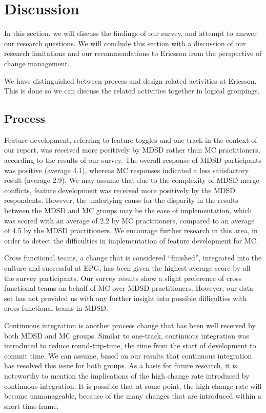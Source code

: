 \documentclass[final_report_innit.tex]{subfiles}
\begin{document}
\section{Discussion}

In this section, we will discuss the findings of our survey, and attempt to answer our research questions. We will conclude this section with a discussion of our research limitations and our recommendations to Ericsson from the perspective of change management. 

We have distinguished between process and design related activities at Ericsson. This is done so we can discuss the related activities together in logical groupings.

\subsection*{Process}

Feature development, referring to feature toggles and one track in the context of our report, was received more positively by MDSD rather than MC practitioners, according to the results of our survey. The overall response of MDSD participants was positive (average 4.1), whereas MC responses indicated a less satisfactory result (average 2.9). We may assume that due to the complexity of MDSD merge conflicts, feature development was received more positively by the MDSD respondents. However, the underlying cause for the disparity in the results between the MDSD and MC groups may be the ease of implementation, which was scored with an average of 2.2 by MC practitioners, compared to an average of 4.5 by the MDSD practitioners. We encourage further research in this area, in order to detect the difficulties in implementation of feature development for MC.

Cross functional teams, a change that is considered ``finished'', integrated into the culture and successful at EPG, has been given the highest average score by all the survey participants. Our survey results show a slight preference of cross functional teams on behalf of MC over MDSD practitioners. However, our data set has not provided us with any further insight into possible difficulties with cross functional teams in MDSD. 

Continuous integration is another process change that has been well received by both MDSD and MC groups. Similar to one-track, continuous integration was introduced to reduce round-trip-time, the time from the start of development to commit time. We can assume, based on our results that continuous integration has resolved this issue for both groups. As a basis for future research, it is noteworthy to mention the implications of the high change rate introduced by continuous integration. It is possible that at some point, the high change rate will become unmanageable, because of the many changes that are introduced within a short time-frame.
\end{document}
